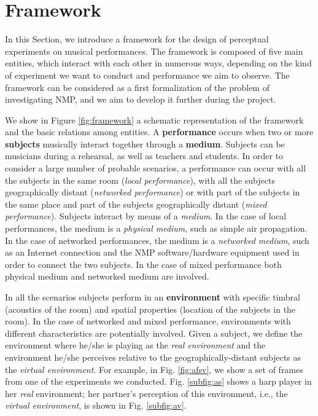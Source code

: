 \section{Framework}\label{sec:framework}
In this Section, we introduce a framework for the design of perceptual experiments on musical performances. The framework is composed of five main entities, which interact with each other in numerous ways, depending on the kind of experiment we want to conduct and performance we aim to observe. The framework can be considered as a first formalization of the problem of investigating NMP, and we aim to develop it further during the project. 

We show in Figure \ref{fig:framework} a schematic representation of the framework and the basic relations among entities. A \textbf{performance} occurs when two or more \textbf{subjects} musically interact together through a \textbf{medium}. Subjects can be musicians during a rehearsal, as well as teachers and students. In order to consider a large number of probable scenarios, a performance can occur with all the subjects in the same room (\textit{local performance}), with all the subjects geographically distant (\textit{networked performance}) or with part of the subjects in the same place and part of the subjects geographically distant (\textit{mixed performance}). Subjects interact by means of a \textit{medium}. In the case of local performances, the medium is a \textit{physical medium}, such as simple air propagation. In the case of networked performances, the medium is a \textit{networked medium}, such as an Internet connection and the NMP software/hardware equipment used in order to connect the two subjects. In the case of mixed performance both physical medium and networked medium are involved. 

In all the scenarios subjects perform in an \textbf{environment} with specific timbral (acoustics  of the room) and spatial properties (location of the subjects in the room). In the case of networked and mixed performance, environments with different characteristics are potentially involved. Given a subject, we define the environment where he/she is playing as the \textit{real environment} and the environment he/she perceives relative to the geographically-distant subjects as the \textit{virtual environment}. For example, in Fig. \ref{fig:afsv}, we show a set of frames from one of the experiments we conducted. Fig. \ref{subfig:as} shows a harp player in her \textit{real} environment; her partner's perception of this environment, i.e., the \textit{virtual environment}, is shown in Fig. \ref{subfig:av}. 

